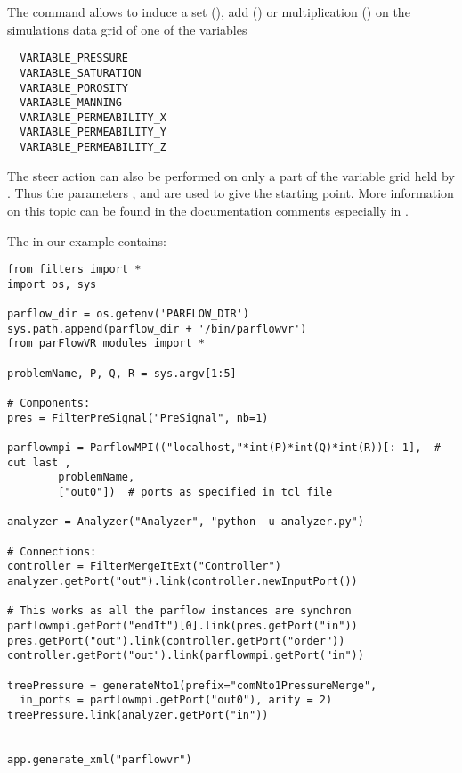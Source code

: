 The  command allows to induce a set
(), add () or multiplication
() on the simulations data grid of one of the variables
\begin{display}\begin{verbatim}
  VARIABLE_PRESSURE
  VARIABLE_SATURATION
  VARIABLE_POROSITY
  VARIABLE_MANNING
  VARIABLE_PERMEABILITY_X
  VARIABLE_PERMEABILITY_Y
  VARIABLE_PERMEABILITY_Z
\end{verbatim}\end{display}
The steer action can also be performed on only a part of the variable grid held by \parflow{}.
Thus the parameters ,  and  are used to give the starting point.
More information on this topic can be found in the documentation comments especially in
.

The  in our example contains:
\begin{display}\begin{verbatim}
from filters import *
import os, sys

parflow_dir = os.getenv('PARFLOW_DIR')
sys.path.append(parflow_dir + '/bin/parflowvr')
from parFlowVR_modules import *

problemName, P, Q, R = sys.argv[1:5]

# Components:
pres = FilterPreSignal("PreSignal", nb=1)

parflowmpi = ParflowMPI(("localhost,"*int(P)*int(Q)*int(R))[:-1],  # cut last ,
        problemName,
        ["out0"])  # ports as specified in tcl file

analyzer = Analyzer("Analyzer", "python -u analyzer.py")

# Connections:
controller = FilterMergeItExt("Controller")
analyzer.getPort("out").link(controller.newInputPort())

# This works as all the parflow instances are synchron
parflowmpi.getPort("endIt")[0].link(pres.getPort("in"))
pres.getPort("out").link(controller.getPort("order"))
controller.getPort("out").link(parflowmpi.getPort("in"))

treePressure = generateNto1(prefix="comNto1PressureMerge",
  in_ports = parflowmpi.getPort("out0"), arity = 2)
treePressure.link(analyzer.getPort("in"))


app.generate_xml("parflowvr")
\end{verbatim}\end{display}

